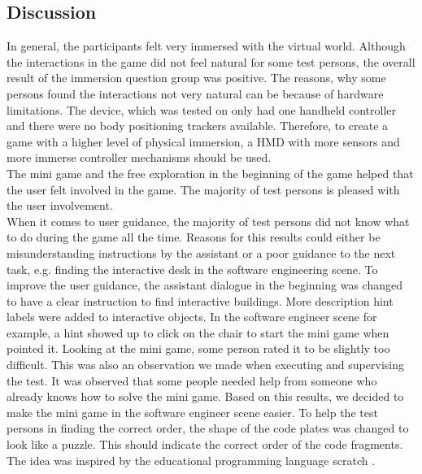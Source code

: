 \subsection{Discussion}
In general, the participants felt very immersed with the virtual world. Although the interactions in the game did not feel natural for some test persons, the overall result of the immersion question group was positive. The reasons, why some persons found the interactions not very natural can be because of hardware limitations. The device, which was tested on only had one handheld controller and there were no body positioning trackers available. Therefore, to create a game with a higher level of physical immersion, a HMD with more sensors and more immerse controller mechanisms should be used. \\
The mini game and the free exploration in the beginning of the game helped that the user felt involved in the game. The majority of test persons is pleased with the user involvement.\\
When it comes to user guidance, the majority of test persons did not know what to do during the game all the time. Reasons for this results could either be misunderstanding instructions by the assistant or a poor guidance to the next task, e.g. finding the interactive desk in the software engineering scene. To improve the user guidance, the assistant dialogue in the beginning was changed to have a clear instruction to find interactive buildings. More description hint labels were added to interactive objects. In the software engineer scene for example, a hint showed up to click on the chair to start the mini game when pointed it.
Looking at the mini game, some person rated it to be slightly too difficult. This was also an observation we made when executing and supervising the test. It was observed that some  people needed help from someone who already knows how to solve the mini game. Based on this results, we decided to make the mini game in the software engineer scene easier. To help the test persons in finding the correct order, the shape of the code plates was changed to look like a puzzle. This should indicate the correct order of the code fragments. The idea was inspired by the educational programming language scratch \cite{https://scratch.mit.edu/}.